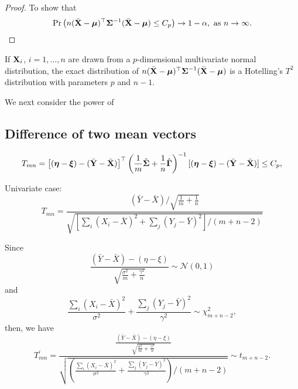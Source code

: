 \begin{proof}
	To show that
	\begin{equation*}
		\Pr\left(n(\bar{\bfX}-\bfmu)^{\top}\bfSigma^{-1}(\bar{\bfX}-\bfmu)\leq C_{p}\right)\rightarrow1-\alpha,\ \text{as}\ n\rightarrow\infty.
	\end{equation*}
\end{proof}

\begin{remark}
	If \(\mathbf{X}_{i}\), \(i=1,\ldots,n\) are drawn from a \(p\)-dimensional multivariate normal distribution, the exact distribution of \(n(\bar{\mathbf{X}}-\boldsymbol{\mu})^{\top}\boldsymbol{\Sigma}^{-1}(\bar{\mathbf{X}}-\boldsymbol{\mu})\) is a Hotelling's \(T^{2}\) distribution with parameters \(p\) and \(n-1\).
\end{remark}

We next consider the power of

\subsection{Difference of two mean vectors}

\begin{equation*}
	T_{mn}=\left[(\boldsymbol{\eta}-\boldsymbol{\xi})-(\bar{\mathbf{Y}}-\bar{\mathbf{X}})\right]^{\top}\left(\frac{1}{m}\hat{\boldsymbol{\Sigma}}+\frac{1}{n}\hat{\boldsymbol{\Gamma}}\right)^{-1}[(\boldsymbol{\eta}-\boldsymbol{\xi})-(\bar{\mathbf{Y}}-\bar{\mathbf{X}})]\leq C_{p},
\end{equation*}

Univariate case:
\begin{equation*}
	T_{mn}=\frac{(\bar{Y}-\bar{X})/\sqrt{\frac{1}{m}+\frac{1}{n}}}{\sqrt{\left[\sum_{i}\left(X_i-\bar{X}\right)^2+\sum_{j}\left(Y_j-\bar{Y}\right)^2\right]/(m+n-2)}}
\end{equation*}

Since
\begin{equation*}
	\frac{(\bar{Y}-\bar{X})-(\eta-\xi)}{\sqrt{\frac{\sigma^{2}}{m}+\frac{\gamma^{2}}{n}}}\sim\mathcal{N}(0,1)
\end{equation*}
and
\begin{equation*}
	\frac{\sum_{i}\left(X_i-\bar{X}\right)^2}{\sigma^{2}}+\frac{\sum_{j}\left(Y_j-\bar{Y}\right)^2}{\gamma^{2}}\sim\chi^{2}_{m+n-2},
\end{equation*}
then, we have
\begin{equation*}
	T_{mn}^{\prime}=\frac{\frac{(\bar{Y}-\bar{X})-(\eta-\xi)}{\sqrt{\frac{\sigma^{2}}{m}+\frac{\gamma^{2}}{n}}}}{\sqrt{\left(\frac{\sum_{i}\left(X_i-\bar{X}\right)^2}{\sigma^{2}}+\frac{\sum_{j}\left(Y_j-\bar{Y}\right)^2}{\gamma^{2}}\right)/(m+n-2)}}\sim t_{m+n-2}.
\end{equation*}

